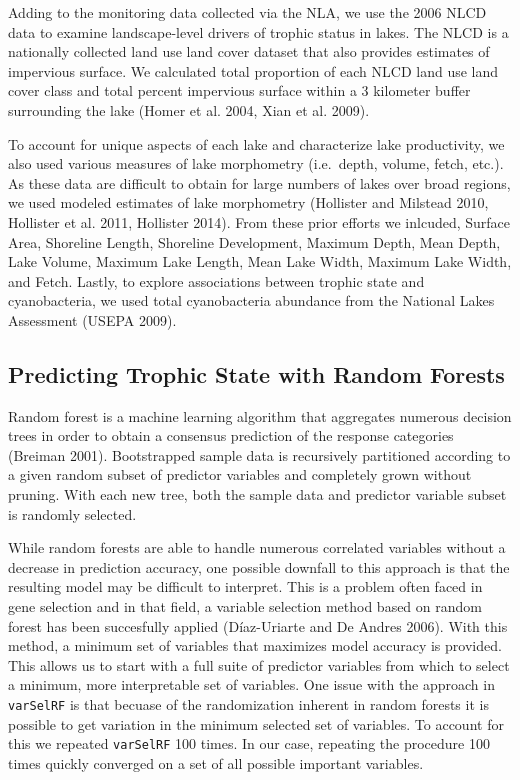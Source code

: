 \documentclass[11pt,]{article}
\begin{document}
Adding to the monitoring data collected via the NLA, we use the 2006
NLCD data to examine landscape-level drivers of trophic status in lakes.
The NLCD is a nationally collected land use land cover dataset that also
provides estimates of impervious surface. We calculated total proportion
of each NLCD land use land cover class and total percent impervious
surface within a 3 kilometer buffer surrounding the lake (Homer et al.
2004, Xian et al. 2009).

To account for unique aspects of each lake and characterize lake
productivity, we also used various measures of lake morphometry
(i.e.~depth, volume, fetch, etc.). As these data are difficult to obtain
for large numbers of lakes over broad regions, we used modeled estimates
of lake morphometry (Hollister and Milstead 2010, Hollister et al. 2011,
Hollister 2014). From these prior efforts we inlcuded, Surface Area,
Shoreline Length, Shoreline Development, Maximum Depth, Mean Depth, Lake
Volume, Maximum Lake Length, Mean Lake Width, Maximum Lake Width, and
Fetch. Lastly, to explore associations between trophic state and
cyanobacteria, we used total cyanobacteria abundance from the National
Lakes Assessment (USEPA 2009).

\subsection{Predicting Trophic State with Random
Forests}\label{predicting-trophic-state-with-random-forests}

Random forest is a machine learning algorithm that aggregates numerous
decision trees in order to obtain a consensus prediction of the response
categories (Breiman 2001). Bootstrapped sample data is recursively
partitioned according to a given random subset of predictor variables
and completely grown without pruning. With each new tree, both the
sample data and predictor variable subset is randomly selected.

While random forests are able to handle numerous correlated variables
without a decrease in prediction accuracy, one possible downfall to this
approach is that the resulting model may be difficult to interpret. This
is a problem often faced in gene selection and in that field, a variable
selection method based on random forest has been succesfully applied
(D{í}az-Uriarte and De Andres 2006). With this method, a minimum set of
variables that maximizes model accuracy is provided. This allows us to
start with a full suite of predictor variables from which to select a
minimum, more interpretable set of variables. One issue with the
approach in \texttt{varSelRF} is that becuase of the randomization
inherent in random forests it is possible to get variation in the
minimum selected set of variables. To account for this we repeated
\texttt{varSelRF} 100 times. In our case, repeating the procedure 100
times quickly converged on a set of all possible important variables.
\end{document}
